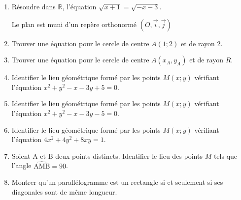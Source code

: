 \documentclass{book}
\begin{document}

\fontsize{10}{12}\selectfont

\begin{enumerate}
 \item Résoudre dans $\mathbb{R}$, l'équation $\sqrt{x+1}=\sqrt{-x-3}$.
 
 Le plan est muni d'un repère orthonormé $(O, \vec{i},\vec{j})$
 \item Trouver une équation pour le cercle de centre $A(1;2)$ et de rayon 2.
 \item Trouver une équation pour le cercle de centre $A(x_A,y_A)$ et de rayon $R$.
 \item Identifier le lieu géométrique formé par les points $M(x;y)$ vérifiant l'équation
 $x^2+y^2-x-3y+5=0$.
 \item Identifier le lieu géométrique formé par les points $M(x;y)$ vérifiant l'équation
 $x^2+y^2-x-3y-5=0$.
 \item Identifier le lieu géométrique formé par les points $M(x;y)$ vérifiant l'équation
 $4x^2+4y^2+8xy=1$.
 \item Soient A et B deux points distincts. Identifier le lieu des points $M$ tels que l'angle $\widehat{\mathrm{AMB}}= 90$\degre.
 \item Montrer qu'un parallélogramme est un rectangle si et seulement si ses diagonales sont de même longueur.
\end{enumerate}
\end{document}
